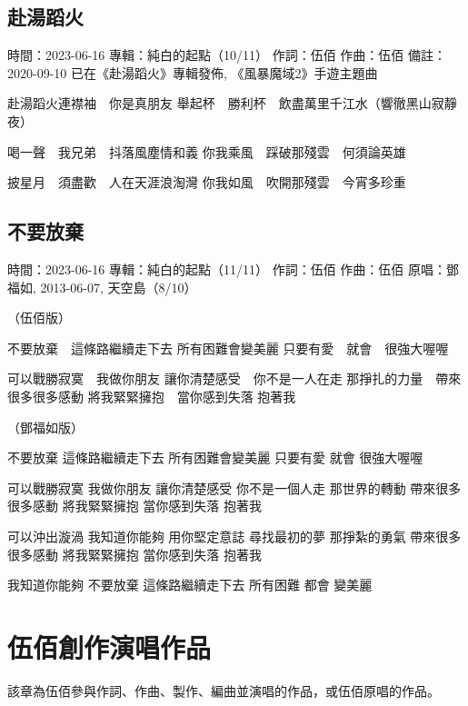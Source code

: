\documentclass[UTF8,a4paper,oneside,twocolumn,12pt]{ctexbook}
\newcommand{\infopair}[2]{\textbullet #1：#2}
\newcommand{\zc}[1][伍佰]{\infopair{作詞}{#1}}
\newcommand{\zq}[1][伍佰]{\infopair{作曲}{#1}}
\newcommand{\zj}[1]{\infopair{專輯}{#1}}
\newcommand{\yc}[1]{\infopair{原唱}{#1}}
\newcommand{\sj}[1]{\infopair{時間}{#1}}
\newcommand{\bz}[1]{\infopair{備註}{#1}}
\newenvironment{info}{\begin{flushleft}\kaishu
	}
	{\end{flushleft}\normalsize\yahei\par}
\newenvironment{lyric}{
	}
{}
\begin{document}
\section{赴湯蹈火}
\begin{info}
	\sj{2023-06-16}
	\zj{純白的起點（10/11）}
	\zc
	\zq
	\bz{2020-09-10 已在《赴湯蹈火》專輯發佈, 《風暴魔域2》手遊主題曲}
\end{info}
\begin{lyric}
	赴湯蹈火連襟袖　你是真朋友
	舉起杯　勝利杯　飲盡萬里千江水（響徹黑山寂靜夜）

	喝一聲　我兄弟　抖落風塵情和義
	你我乘風　踩破那殘雲　何須論英雄

	披星月　須盡歡　人在天涯浪淘灣
	你我如風　吹開那殘雲　今宵多珍重
\end{lyric}

\section{不要放棄}
\begin{info}
	\sj{2023-06-16}
	\zj{純白的起點（11/11）}
	\zc
	\zq
	\yc{鄧福如, 2013-06-07, 天空島（8/10）}
\end{info}
\begin{lyric}
	（伍佰版）

	不要放棄　這條路繼續走下去
	所有困難會變美麗
	只要有愛　就會　很強大喔喔

	可以戰勝寂寞　我做你朋友
	讓你清楚感受　你不是一人在走
	那掙扎的力量　帶來很多很多感動
	將我緊緊擁抱　當你感到失落
	抱著我

	（鄧福如版）

	不要放棄 這條路繼續走下去
	所有困難會變美麗
	只要有愛 就會 很強大喔喔

	可以戰勝寂寞 我做你朋友
	讓你清楚感受 你不是一個人走
	那世界的轉動 帶來很多很多感動
	將我緊緊擁抱 當你感到失落
	抱著我

	可以沖出漩渦 我知道你能夠
	用你堅定意誌 尋找最初的夢
	那掙紮的勇氣 帶來很多很多感動
	將我緊緊擁抱 當你感到失落
	抱著我

	我知道你能夠
	不要放棄 這條路繼續走下去
	所有困難 都會 變美麗
\end{lyric}

\chapter{伍佰創作演唱作品}
該章為伍佰參與作詞、作曲、製作、編曲並演唱的作品，或伍佰原唱的作品。
\end{document}
